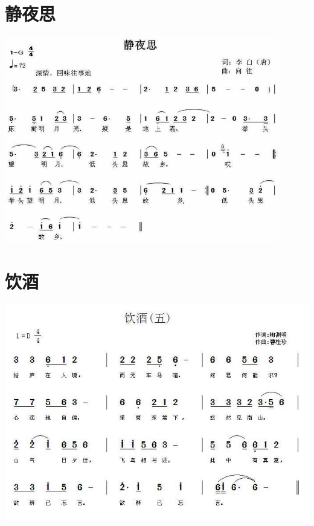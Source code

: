 \documentclass[cn,pad,twocol]{elegantbook}
\begin{document}
\section{静夜思}                \includegraphics[width=0.9\textwidth]{dongxiao/20200411-静夜思}
\section{饮酒}                  \includegraphics[width=\textwidth]{dongxiao/20200808-饮酒-陶渊明.jpg}
\end{document}
